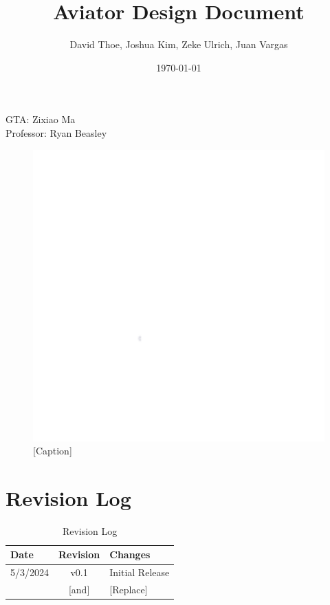 \documentclass[letterpaper, 11pt]{article}
\begin{document}

\title{Aviator Design Document}
\author{David Thoe, Joshua Kim, Zeke Ulrich, Juan Vargas}
\date{\today}
\maketitle

\begin{center}
    GTA: Zixiao Ma \\
    Professor: Ryan Beasley
\end{center}

\begin{figure}[h]
    \centering
    \includegraphics[width=12cm,scale=1]{images/white.png}
    \caption{[Caption]}
\end{figure}

\clearpage
\tableofcontents

\clearpage
\listoffigures

\clearpage
\listoftables

\clearpage
\section*{Revision Log}
\begin{table}[h]
    \begin{tabularx}{\textwidth}{|l|c|X|} %
        \hline
        Date     & Revision & Changes         \\ \hline
        5/3/2024 & v0.1     & Initial Release \\ \hline
        [Copy]   & [and]    & [Replace]       \\ \hline
    \end{tabularx}
    \caption{Revision Log}
\end{table}
\end{document}
